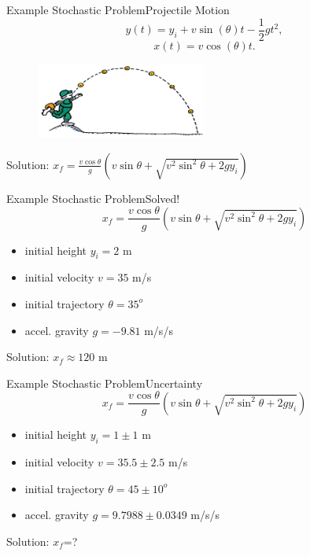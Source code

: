 \documentclass{beamer}
\begin{document}
\begin{frame}{Example Stochastic Problem}{Projectile Motion}\vspace{-30pt}
\begin{equation*}
y(t)=y_i + v\sin(\theta)t - \frac{1}{2}gt^2,
\end{equation*}
\begin{equation*}
x(t)=v\cos(\theta)t.
\end{equation*}
  \begin{figure}[h!]
    \centering
      \includegraphics[width=0.5\textwidth]{../graphics/projectile}
  \end{figure}
\vspace{-10pt}
Solution: $x_f=\frac{v\cos{\theta}}{g}\left(v\sin\theta+\sqrt{v^2\sin^2\theta + 2gy_i}\right)$
\end{frame}

\begin{frame}{Example Stochastic Problem}{Solved!}\vspace{-50pt}
\begin{equation*}
x_f=\frac{v\cos{\theta}}{g}\left(v\sin\theta+\sqrt{v^2\sin^2\theta + 2gy_i}\right)
\end{equation*}
\begin{itemize}
\item initial height $y_i = 2$ m
\item initial velocity $v = 35$ m/s
\item initial trajectory $\theta = 35^o$
\item accel. gravity $g = -9.81$ m/s/s
\end{itemize}
Solution: $x_f\approx120$ m
\end{frame}

\begin{frame}{Example Stochastic Problem}{Uncertainty}\vspace{-50pt}
\begin{equation*}
x_f=\frac{v\cos{\theta}}{g}\left(v\sin\theta+\sqrt{v^2\sin^2\theta + 2gy_i}\right)
\end{equation*}
\begin{itemize}
\item initial height $y_i = 1\pm1$ m
\item initial velocity $v = 35.5\pm2.5$ m/s
\item initial trajectory $\theta = 45\pm10^o$
\item accel. gravity $g = 9.7988 \pm0.0349$ m/s/s
\end{itemize}
Solution: $x_f$=?
\end{frame}
\end{document}
